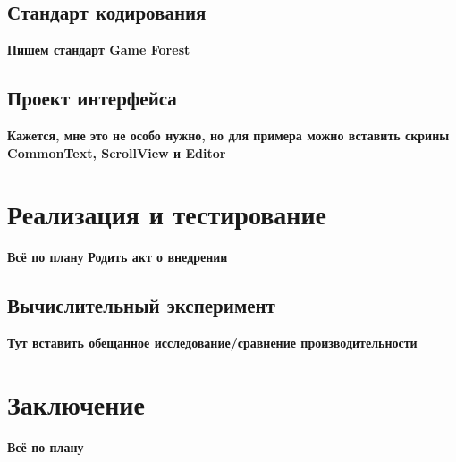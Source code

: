 \documentclass{fefu}
\begin{document}
		\subsection{Стандарт кодирования}
			\textbf{Пишем стандарт Game Forest}
		\subsection{Проект интерфейса}
			\textbf{Кажется, мне это не особо нужно, но для примера можно вставить скрины
			CommonText, ScrollView и Editor}
	\section{Реализация и тестирование}
		\textbf{Всё по плану}
		\textbf{Родить акт о внедрении}
		\subsection{Вычислительный эксперимент}
			\textbf{Тут вставить обещанное исследование/сравнение производительности}
	\section*{Заключение}
		\textbf{Всё по плану}
	\newpage
	
	
	
\end{document}

